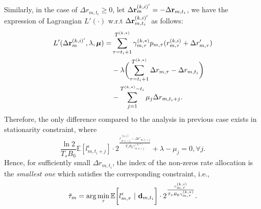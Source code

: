 Similarly, in the case of $\Delta{r}_{m,t_i} \ge 0$, let $\Delta{{\mathbf{r}}}^{(k,i)'}_{m} = - \Delta{{\mathbf{r}}}_{m,t_i}$, we have the expression of Lagrangian $L'(\cdot)$ w.r.t $\Delta{{\mathbf{r}}}^{(k,i)'}_{m,t_i}$ as follows:
\begin{align*}
    L'( \Delta{\slide{r}}^{(k,i)'}_{m}, \lambda, \vecG{\mu} ) =
    &\sum_{\tau=t_i+1}^{T^{(k,*)}} \gamma^{(k,*)}_{m,\tau} p_{m,\tau}( r^{(k,i)}_{m,\tau} + \Delta{r}'_{m,\tau} )
    \nonumber\\
    &- \lambda \Paren{ \sum_{\tau=t_i+1}^{T^{(k,*)}} \Delta{r}_{m,\tau} - \Delta{r}_{m,t_i} }
    \nonumber\\
    &- \sum_{j=1}^{T^{(k,*)}-t_i} \mu_{j} \Delta{r}_{m,t_i+j}.
\end{align*}
Therefore, the only difference compared to the analysis in previous case exists in stationarity constraint, where
$$
\frac{\ln{2}}{T_sB_0} \mathbb{E}[l^{\epsilon}_{m,t_i+j}] \cdot 2^{\frac{r^{(k,i)}_{m,t_i+j} - \Delta{r}'_{m,t_i+j}}{T_sB_0 \gamma^{(k,*)}_{m,t_i+j}}} + \lambda - \mu_j = 0,
    \forall j.
$$
Hence, for sufficiently small $\Delta{r}_{m,t_i}$, the index of the non-zeros rate allocation is the {\it smallest one} which satisfies the corresponding constraint, i.e.,
$$
\breve{\tau}_{m} = \arg\min_{\tau} \mathbb{E}\bigg[ l_{m,\tau}^{\epsilon}~|~\mathbf{d}_{m,t_i} \bigg]
                          \cdot 2^{\frac{r^{(k,i)}_{m,\tau}}{T_sB_0 \gamma^{(k,*)}_{m,\tau}}}.
$$

